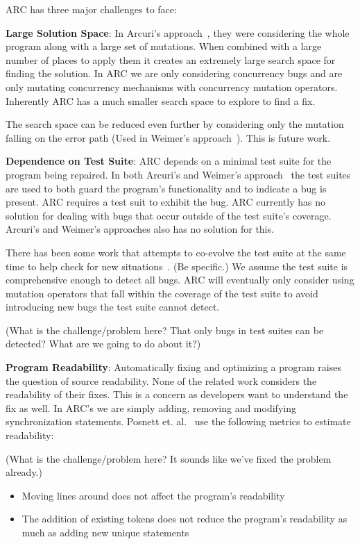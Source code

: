 \documentclass{llncs}
\begin{document}
ARC has three major challenges to face:

\textbf{Large Solution Space}: In Arcuri's approach~\cite{AY08}, they were
considering the whole program along with a large set of mutations. When
combined with a large number of places to apply them it creates an extremely
large search space for finding the solution. In ARC we are only considering
concurrency bugs and are only mutating concurrency mechanisms with concurrency
mutation operators. Inherently ARC has a much smaller search space to explore
to find a fix.

The search space can be reduced even further by considering only the mutation
falling  on the error path (Used in Weimer's approach~\cite{GNFW11}). This is
future work.

\textbf{Dependence on Test Suite}: ARC depends on a minimal test suite for the
program being repaired. In both Arcuri's and Weimer's
approach~\cite{AY08,GNFW11} the test suites are used to both guard the
program's functionality and to indicate a bug is present. ARC requires a test
suit to exhibit the bug. ARC currently has no solution for dealing with bugs
that occur outside of the test suite's coverage. Arcuri's and Weimer's
approaches also has no solution for this.

There has been some work that attempts to co-evolve the test suite at the same
time to help check for new situations~\cite{WT10}. (Be specific.) We assume the
test suite is comprehensive enough to detect all bugs. ARC will eventually only
consider using mutation operators that fall within the coverage of the test
suite to avoid introducing new bugs the test suite cannot detect.

(What is the challenge/problem here? That only bugs in test suites can be
detected? What are we going to do about it?)

\textbf{Program Readability}: Automatically fixing and optimizing a program
raises the question of source readability. None of the related work considers
the readability of their fixes. This is a concern as developers want to
understand the fix as well. In ARC's we are simply adding, removing and
modifying synchronization statements. Posnett et. al.~\cite{PHD11} use the
following metrics to estimate readability:

(What is the challenge/problem here? It sounds like we've fixed the problem
already.)

\begin{itemize}
  \item Moving lines around does not affect the program's readability
  \item The addition of existing tokens does not reduce the program's
readability as much as adding new unique statements
\end{itemize}
\end{document}
